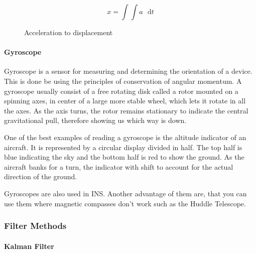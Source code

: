 \begin{figure}[H]
\[
x=\int\int a\mathrm{\text{ }d}t
\]
 

\protect\caption{Acceleration to displacement}


\end{figure}



\paragraph{Gyroscope}

Gyroscope\cite{innertial_nav_sys} is a sensor for measuring and determining the orientation
of a device. This is done be using the principles of conservation
of angular momentum. A gyroscope usually consist of a free rotating
disk called a rotor mounted on a spinning axes, in center of a large
more stable wheel, which lets it rotate in all the axes. As the axis
turns, the rotor remains stationary to indicate the central gravitational
pull, therefore showing us which way is down.

One of the best examples of reading a gyroscope is the altitude indicator
of an aircraft. It is represented by a circular display divided in
half. The top half is blue indicating the sky and the bottom half
is red to show the ground. As the aircraft banks for a turn, the indicator
with shift to account for the actual direction of the ground.

Gyroscopes are also used in INS. Another advantage of them are, that
you can use them where magnetic compasses don't work such as the Huddle
Telescope\cite{gyroscope-wiki}.

\subsubsection{Filter Methods} \label{filter_methods}


\paragraph{Kalman Filter}
